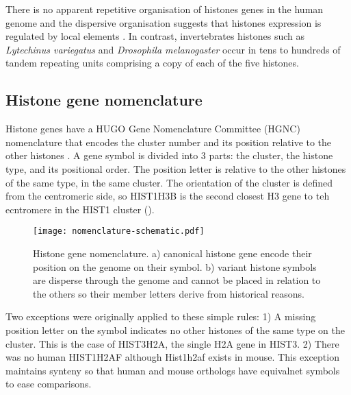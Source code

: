 	There is no apparent repetitive organisation of histones genes in the human genome 
	and the dispersive organisation suggests that histones expression is regulated by local elements \citep{close-regulators}.
	In contrast, invertebrates histones such as \textit{Lytechinus variegatus} and \textit{Drosophila melanogaster} 
	occur in tens to hundreds of tandem repeating units comprising a copy of each of the five histones.

  \subsection{Histone gene nomenclature}
    Histone genes have a HUGO Gene Nomenclature Committee (HGNC) nomenclature 
	that encodes the cluster number and its position relative to the other histones \citep{Marzluff02}.
	A gene symbol is divided into 3 parts: the cluster, the histone type, and its positional order.
	The position letter is relative to the other histones of the same type, in the same cluster.
    The orientation of the cluster is defined from the centromeric side, 
	so HIST1H3B is the second closest H3 gene to teh ecntromere in the HIST1 cluster ().

    \begin{figure*}
      \centering
      \texttt{[image: nomenclature-schematic.pdf]}
      \caption{Histone gene nomenclature. a) canonical histone gene encode their position
               on the genome on their symbol. b) variant histone symbols are disperse through
               the genome and cannot be placed in relation to the others so their member
               letters derive from historical reasons.}
      \label{fig:nomenclature}
    \end{figure*}

    Two exceptions were originally applied to these simple rules: 
	1) A missing position letter on the symbol indicates no other histones of the same type on the cluster. 
	This is the case of HIST3H2A, the single H2A gene in HIST3. 
	2) There was no human HIST1H2AF although Hist1h2af exists in mouse. This exception maintains synteny so that
    human and mouse orthologs have equivalnet symbols to ease comparisons.

